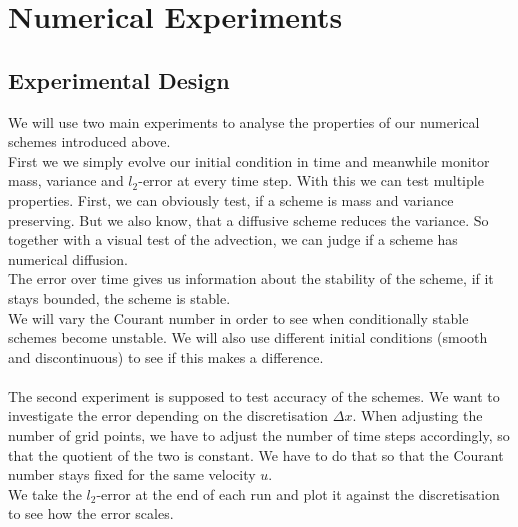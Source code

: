 \section{Numerical Experiments}
\subsection{Experimental Design}
We will use two main experiments to analyse the properties of our numerical schemes introduced above. \\
First we we simply evolve our initial condition in time and meanwhile monitor mass, variance and $l_2$-error at every time step. 
With this we can test multiple properties. First, we can obviously test, if a scheme is mass and variance preserving. But we also know, that a diffusive scheme reduces the variance. So together with a visual test of the advection, we can judge if a scheme has numerical diffusion. \\
The error over time gives us information about the stability of the scheme, if it stays bounded, the scheme is stable. \\
We will vary the Courant number in order to see when conditionally stable schemes become unstable. We will also use different initial conditions (smooth and discontinuous) to see if this makes a difference.\\ \\
The second experiment is supposed to test accuracy of the schemes. We want to investigate the error depending on the discretisation $\Delta x$. When adjusting the number of grid points, we have to adjust the number of time steps accordingly, so that the quotient of the two is constant. We have to do that so that the  Courant number stays fixed for the same velocity $u$. \\
We take the $l_2$-error at the end of each run and plot it against the discretisation to see how the error scales. 
